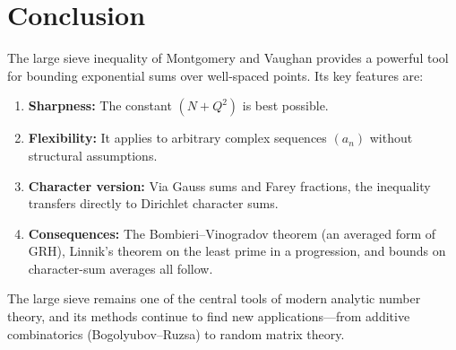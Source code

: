 \documentclass[12pt,a4paper]{amsart}
\theoremstyle{definition}
\begin{document}
\section{Conclusion}

The large sieve inequality of Montgomery and Vaughan provides a powerful
tool for bounding exponential sums over well-spaced points.  Its key
features are:

\begin{enumerate}
  \item \textbf{Sharpness:} The constant $(N + Q^2)$ is best possible.
  \item \textbf{Flexibility:} It applies to arbitrary complex sequences
    $(a_n)$ without structural assumptions.
  \item \textbf{Character version:} Via Gauss sums and Farey fractions,
    the inequality transfers directly to Dirichlet character sums.
  \item \textbf{Consequences:} The Bombieri--Vinogradov theorem (an
    averaged form of GRH), Linnik's theorem on the least prime in a
    progression, and bounds on character-sum averages all follow.
\end{enumerate}

The large sieve remains one of the central tools of modern analytic number
theory, and its methods continue to find new applications---from additive
combinatorics (Bogolyubov--Ruzsa) to random matrix theory.
\end{document}
